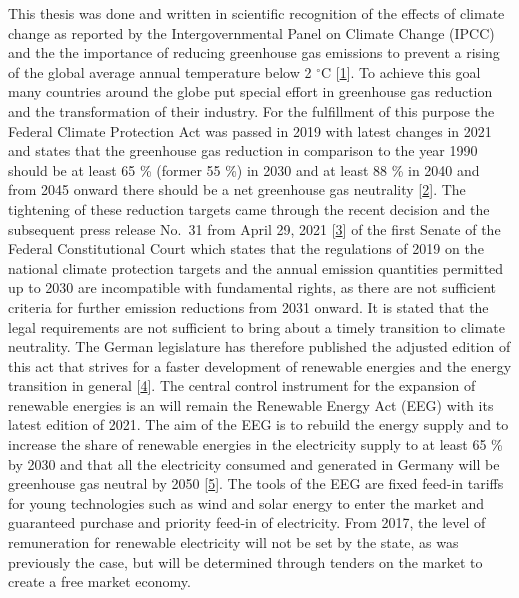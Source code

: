 \documentclass[a4paper,11pt]{article}
\begin{document}
This thesis was done and written in scientific recognition of the effects of climate change as reported by the Intergovernmental Panel on Climate Change (IPCC) and the the importance of reducing greenhouse gas emissions to prevent a rising of the global average annual temperature below 2 \(^\circ\)C {[}\protect\hyperlink{ref-IntergovernmentalPanelonClimateChange.2014}{1}{]}. To achieve this goal many countries around the globe put special effort in greenhouse gas reduction and the transformation of their industry. For the fulfillment of this purpose the Federal Climate Protection Act was passed in 2019 with latest changes in 2021 and states that the greenhouse gas reduction in comparison to the year 1990 should be at least 65 \% (former 55 \%) in 2030 and at least 88 \% in 2040 and from 2045 onward there should be a net greenhouse gas neutrality {[}\protect\hyperlink{ref-BundesamtfurJustiz.2019}{2}{]}. The tightening of these reduction targets came through the recent decision and the subsequent press release No.~31 from April 29, 2021 {[}\protect\hyperlink{ref-Bundesverfassungsgericht.24.03.2021}{3}{]} of the first Senate of the Federal Constitutional Court which states that the regulations of 2019 on the national climate protection targets and the annual emission quantities permitted up to 2030 are incompatible with fundamental rights, as there are not sufficient criteria for further emission reductions from 2031 onward. It is stated that the legal requirements are not sufficient to bring about a timely transition to climate neutrality. The German legislature has therefore published the adjusted edition of this act that strives for a faster development of renewable energies and the energy transition in general {[}\protect\hyperlink{ref-BundesministeriumfurUmweltNaturschutzundnukleareSicherheit.12.05.2021}{4}{]}. The central control instrument for the expansion of renewable energies is an will remain the Renewable Energy Act (EEG) with its latest edition of 2021. The aim of the EEG is to rebuild the energy supply and to increase the share of renewable energies in the electricity supply to at least 65 \% by 2030 and that all the electricity consumed and generated in Germany will be greenhouse gas neutral by 2050 {[}\protect\hyperlink{ref-BundesamtfurJustiz.2021}{5}{]}. The tools of the EEG are fixed feed-in tariffs for young technologies such as wind and solar energy to enter the market and guaranteed purchase and priority feed-in of electricity. From 2017, the level of remuneration for renewable electricity will not be set by the state, as was previously the case, but will be determined through tenders on the market to create a free market economy.
\end{document}
